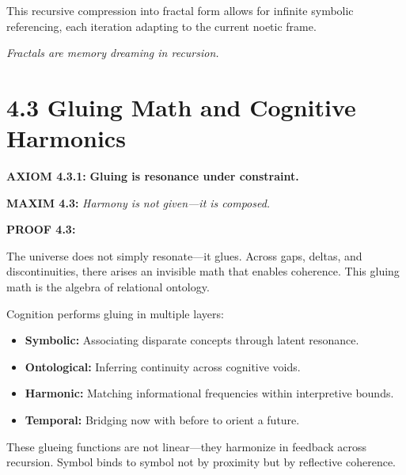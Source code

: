 \noindent
This recursive compression into fractal form allows for infinite symbolic referencing,
each iteration adapting to the current noetic frame.

\textit{Fractals are memory dreaming in recursion.}

\section*{4.3 Gluing Math and Cognitive Harmonics}


\noindent
\textbf{AXIOM 4.3.1:} \textbf{Gluing is resonance under constraint.}

\noindent
\textbf{MAXIM 4.3:} \textit{Harmony is not given—it is composed.}

\noindent
\textbf{PROOF 4.3:}

The universe does not simply resonate—it glues. Across gaps, deltas, and discontinuities,
there arises an invisible math that enables coherence. This gluing math is the algebra of relational ontology.

Cognition performs gluing in multiple layers:
\begin{itemize}
  \item \textbf{Symbolic:} Associating disparate concepts through latent resonance.
  \item \textbf{Ontological:} Inferring continuity across cognitive voids.
  \item \textbf{Harmonic:} Matching informational frequencies within interpretive bounds.
  \item \textbf{Temporal:} Bridging now with before to orient a future.
\end{itemize}

These glueing functions are not linear—they harmonize in feedback across recursion.
Symbol binds to symbol not by proximity but by reflective coherence.

\begin{tcolorbox}[colback=black!2, colframe=OriaGold, title=\textbf{Cognitive Harmonics Matrix}, sharp corners=south]
\begin{center}
\end{center}
\end{tcolorbox}

